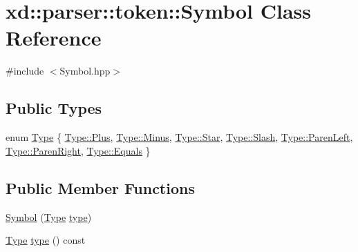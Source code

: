 \hypertarget{classxd_1_1parser_1_1token_1_1_symbol}{}\section{xd\+:\+:parser\+:\+:token\+:\+:Symbol Class Reference}
\label{classxd_1_1parser_1_1token_1_1_symbol}


{\ttfamily \#include $<$Symbol.\+hpp$>$}

\subsection*{Public Types}
\begin{DoxyCompactItemize}
\item 
enum \mbox{\hyperlink{classxd_1_1parser_1_1token_1_1_symbol_a1ccd1a684e22809f543b496a29564483}{Type}} \{ \newline
\mbox{\hyperlink{classxd_1_1parser_1_1token_1_1_symbol_a1ccd1a684e22809f543b496a29564483a32ba78fe43257d3e7f88e3935a8ea0d4}{Type\+::\+Plus}}, 
\mbox{\hyperlink{classxd_1_1parser_1_1token_1_1_symbol_a1ccd1a684e22809f543b496a29564483a453fb623e752c5993f65bc410fd74fe5}{Type\+::\+Minus}}, 
\mbox{\hyperlink{classxd_1_1parser_1_1token_1_1_symbol_a1ccd1a684e22809f543b496a29564483a26f93e6e68e28a698377e941cb59f29a}{Type\+::\+Star}}, 
\mbox{\hyperlink{classxd_1_1parser_1_1token_1_1_symbol_a1ccd1a684e22809f543b496a29564483a358cfe58715d680d9ab09f82e4010cbc}{Type\+::\+Slash}}, 
\newline
\mbox{\hyperlink{classxd_1_1parser_1_1token_1_1_symbol_a1ccd1a684e22809f543b496a29564483a5cb43133e1a05738ab4b96eaabb637f3}{Type\+::\+Paren\+Left}}, 
\mbox{\hyperlink{classxd_1_1parser_1_1token_1_1_symbol_a1ccd1a684e22809f543b496a29564483a96c4c2fe870887ab1bcb0c32b0ceb2da}{Type\+::\+Paren\+Right}}, 
\mbox{\hyperlink{classxd_1_1parser_1_1token_1_1_symbol_a1ccd1a684e22809f543b496a29564483a0ccb67e7eaae09d9e4078d161eeca100}{Type\+::\+Equals}}
 \}
\end{DoxyCompactItemize}
\subsection*{Public Member Functions}
\begin{DoxyCompactItemize}
\item 
\mbox{\hyperlink{classxd_1_1parser_1_1token_1_1_symbol_ac3140dc0d347cedb48d49294efecf082}{Symbol}} (\mbox{\hyperlink{classxd_1_1parser_1_1token_1_1_symbol_a1ccd1a684e22809f543b496a29564483}{Type}} \mbox{\hyperlink{classxd_1_1parser_1_1token_1_1_symbol_a8d390534fa6381eeb93da0305b06ac76}{type}})
\item 
\mbox{\hyperlink{classxd_1_1parser_1_1token_1_1_symbol_a1ccd1a684e22809f543b496a29564483}{Type}} \mbox{\hyperlink{classxd_1_1parser_1_1token_1_1_symbol_a8d390534fa6381eeb93da0305b06ac76}{type}} () const
\end{DoxyCompactItemize}
